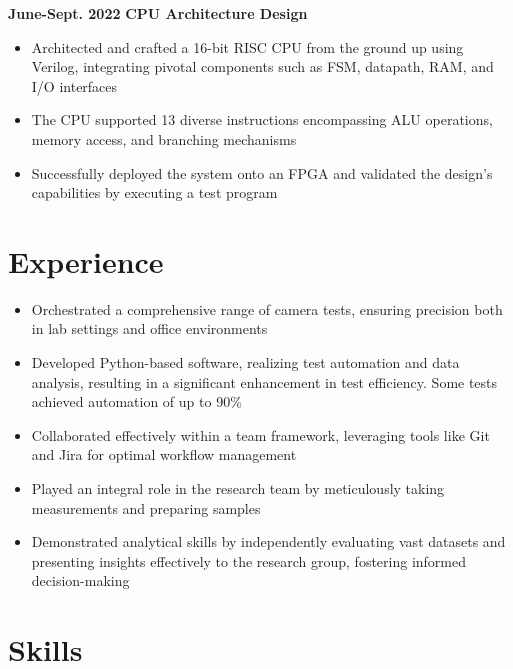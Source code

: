 \documentclass[11pt,a4paper,sans]{moderncv}
\begin{document}
\cventry
{\textnormal{\textbf{June-Sept. 2022}}}
{\textnormal{\textbf{CPU Architecture Design}}}
{}{}{}
{
    \begin{itemize}
    \item Architected and crafted a 16-bit RISC CPU from the ground up using Verilog, integrating pivotal components such as FSM, datapath, RAM, and I/O interfaces
    \item The CPU supported 13 diverse instructions encompassing ALU operations, memory access, and branching mechanisms
    \item Successfully deployed the system onto an FPGA and validated the design's capabilities by executing a test program
\end{itemize}
}

\section{Experience}
{
    \begin{itemize}
    \item Orchestrated a comprehensive range of camera tests, ensuring precision both in lab settings and office environments
    \item Developed Python-based software, realizing test automation and data analysis, resulting in a significant enhancement in test efficiency. Some tests achieved automation of up to 90\%
    \item Collaborated effectively within a team framework, leveraging tools like Git and Jira for optimal workflow management 
    \end{itemize}
}
{
    \begin{itemize}
    \item Played an integral role in the research team by meticulously taking measurements and preparing samples
    \item Demonstrated analytical skills by independently evaluating vast datasets and presenting insights effectively to the research group, fostering informed decision-making
    \end{itemize}
}

\section{Skills}
\cvitem{}{}

\end{document}
